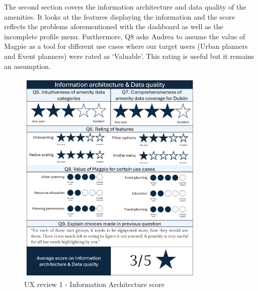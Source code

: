\newpage
\noindent The second section covers the information architecture and data quality of the amenities. It looks at the features displaying the information and the score reflects the problems aforementioned with the dashboard as well as the incomplete profile menu. Furthermore, Q8 asks Andrea to assume the value of Magpie as a tool for different use cases where our target users (Urban planners and Event planners) were rated as `Valuable'. This rating is useful but it remains an assumption.\\
\begin{figure}[h!]
    \centering
    \includegraphics[width=0.8\textwidth]{images/ux-survey1-data.png}
    \caption{UX review 1 - Information Architecture score}
\end{figure}

